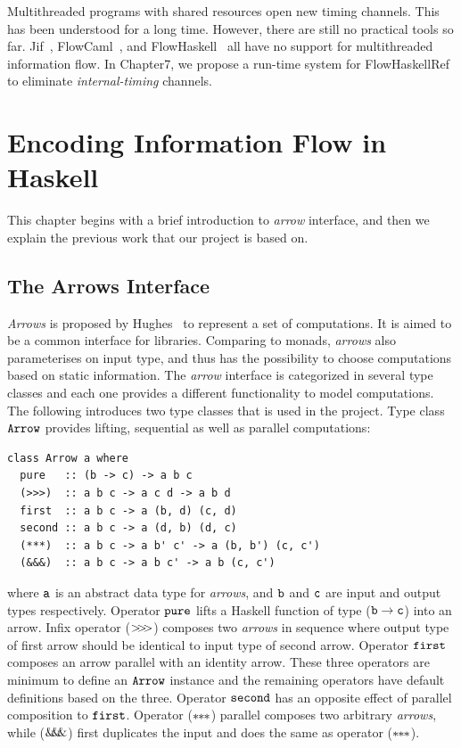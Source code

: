\documentclass[a4paper]{report}
\newcommand{\arrowop}[1]{$#1\negthickspace #1\negthickspace #1$}
\begin{document}
Multithreaded programs with shared resources open new timing channels. This has been understood for a long time. 
However, there are still no practical tools so far. Jif~\cite{jif}, FlowCaml~\cite{FlowCaml}, and 
FlowHaskell~\cite{Li:Zdancewic:CSFW} all have no support for multithreaded information flow.
In Chapter7, we propose a run-time system for FlowHaskellRef to eliminate {\em internal-timing} channels.

%
%
\chapter{Encoding Information Flow in Haskell}

This chapter begins with a brief introduction to {\em arrow} interface, and
then we explain the previous work that our project is based on.

\section{The Arrows Interface}
{\em Arrows} is proposed by Hughes~\cite{Hughes:SCP00} to represent a set of computations. 
It is aimed to be a common interface for libraries.
Comparing to monads, {\em arrows} also parameterises on input type, and thus has the 
possibility to choose computations based on static information. 
The {\em arrow} interface is categorized in several type classes and each one provides a different 
functionality to model computations.
The following introduces two type classes that is used in the project.
Type class $\mathtt{Arrow}$ provides lifting, sequential as well as parallel computations:
\begin{Verbatim}[fontsize=\footnotesize]
class Arrow a where
  pure   :: (b -> c) -> a b c
  (>>>)  :: a b c -> a c d -> a b d
  first  :: a b c -> a (b, d) (c, d)
  second :: a b c -> a (d, b) (d, c)
  (***)  :: a b c -> a b' c' -> a (b, b') (c, c')
  (&&&)  :: a b c -> a b c' -> a b (c, c')
\end{Verbatim}
where $\mathtt{a}$ is an abstract data type for {\em arrows}, and $\mathtt{b}$ and $\mathtt{c}$ are
input and output types respectively. Operator $\mathtt{pure}$ lifts a Haskell function of type 
($\mathtt{b}->\mathtt{c}$) into an arrow. Infix operator (\arrowop{>}) composes two {\em arrows} in
sequence where output type of first arrow should be identical to input type of second arrow.
Operator $\mathtt{first}$ composes an arrow parallel with an identity arrow. These three
operators are minimum to define an $\mathtt{Arrow}$ instance and the remaining operators have 
default definitions based on the three. 
Operator $\mathtt{second}$
has an opposite effect of parallel composition to $\mathtt{first}$. Operator (\arrowop{*}) parallel
composes two arbitrary {\em arrows}, while (\arrowop{\&}) first duplicates the input and does the same
as operator (\arrowop{*}).
\end{document}
